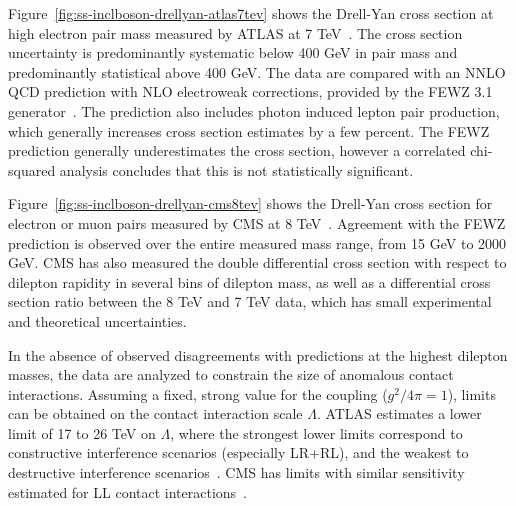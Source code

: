 Figure~\ref{fig:ss-inclboson-drellyan-atlas7tev} shows the Drell-Yan cross
section at high electron pair mass measured by ATLAS at 7 TeV~\cite{Aad:2013iua}.
The cross section uncertainty is predominantly systematic below 400 GeV in pair
mass and predominantly statistical above 400 GeV.  The data are compared with an NNLO QCD
prediction with NLO electroweak corrections, provided by the FEWZ 3.1 generator~\cite{Melnikov:2006kv,Li:2012wna}.
The prediction also includes photon induced lepton pair production, which generally
increases cross section estimates by a few percent. The FEWZ prediction generally underestimates the cross section,
however a correlated chi-squared analysis concludes that this is not statistically significant.

Figure~\ref{fig:ss-inclboson-drellyan-cms8tev} shows the Drell-Yan cross section for electron or muon pairs
measured by CMS at 8 TeV~\cite{CMS:2014jea}.  Agreement with the FEWZ prediction is observed over the
entire measured mass range, from 15 GeV to 2000 GeV.  CMS has also measured the double differential
cross section with respect to dilepton rapidity in several bins of dilepton mass, as well as a differential
cross section ratio between the 8 TeV and 7 TeV data, which has small experimental and theoretical uncertainties.

In the absence of observed disagreements with predictions at the highest dilepton masses, the data are analyzed
to constrain the size of anomalous contact interactions. Assuming a fixed, strong value for the coupling ($g^2/4\pi = 1$),
limits can be obtained on the contact interaction scale $\Lambda$.  ATLAS estimates a lower limit of 17 to 26 TeV on $\Lambda$, where the
strongest lower limits correspond to constructive interference scenarios (especially LR+RL), and the weakest to destructive interference scenarios~\cite{Aad:2014wca}.
CMS has limits with similar sensitivity estimated for LL contact interactions~\cite{Khachatryan:2014fba}.


